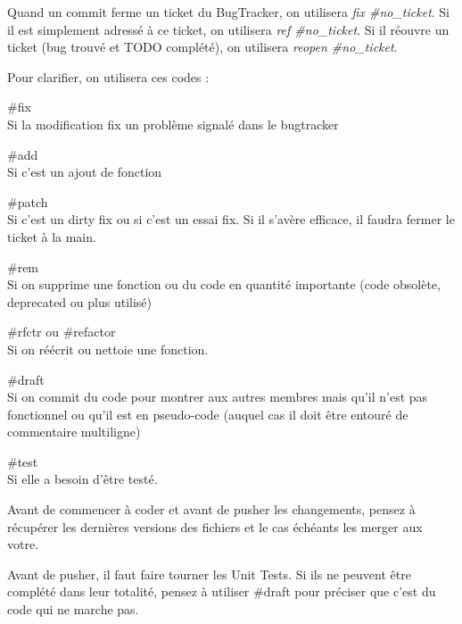 \documentclass[a4paper, titlepage, oneside]{book}
\begin{document}
Quand un commit ferme un ticket du BugTracker, on utilisera \textit{fix \#no\_ticket}. Si il est simplement adressé à ce ticket, on utilisera \textit{ref \#no\_ticket}. Si il réouvre un ticket (bug trouvé et TODO complété), on utilisera \textit{reopen \#no\_ticket}.

Pour clarifier, on utilisera ces codes :

\#fix\\
Si la modification fix un problème signalé dans le bugtracker

\#add\\
Si c'est un ajout de fonction

\#patch\\
Si c'est un dirty fix ou si c'est un essai fix. Si il s'avère efficace, il faudra fermer le ticket à la main.

\#rem\\
Si on supprime une fonction ou du code en quantité importante (code obsolète, deprecated ou plus utilisé)

\#rfctr ou \#refactor\\
Si on réécrit ou nettoie une fonction.

\#draft\\
Si on commit du code pour montrer aux autres membres mais qu'il n'est pas fonctionnel ou qu'il est en pseudo-code 
(auquel cas il doit être entouré de commentaire multiligne)

\#test\\
Si elle a besoin d'être testé.

Avant de commencer à coder et avant de pusher les changements, pensez à récupérer les dernières versions des fichiers et le cas échéants les merger aux votre.

Avant de pusher, il faut faire tourner les Unit Tests. Si ils ne peuvent être complété dans leur totalité, pensez à utiliser \#draft pour préciser que c'est du code qui ne marche pas.
\end{document}
